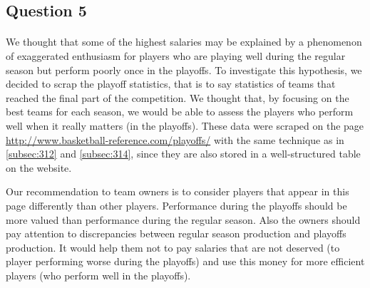 
\subsection{Question 5}
\label{subsec:315}
\paragraph{}We thought that some of the highest salaries may be explained by a phenomenon of exaggerated enthusiasm for players who are playing well during the regular season but perform poorly once in the playoffs. To investigate this hypothesis, we decided to scrap the playoff statistics, that is to say statistics of teams that reached the final part of the competition. We thought that, by focusing on the best teams for each season, we would be able to assess the players who perform well when it really matters (in the playoffs). These data were scraped on the page \url{http://www.basketball-reference.com/playoffs/} with the same technique as in \ref{subsec:312} and \ref{subsec:314}, since they are also stored in a well-structured table on the website. 

Our recommendation to team owners is to consider players that appear in this page differently than other players. Performance during the playoffs should be more valued than performance during the regular season. Also the owners should pay attention to discrepancies between regular season production and playoffs production. It would help them not to pay salaries that are not deserved (to player performing worse during the playoffs) and use this money for more efficient players (who perform well in the playoffs).